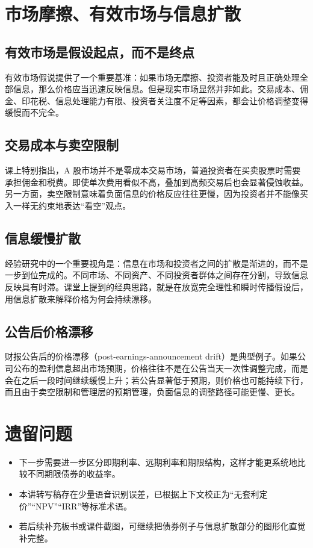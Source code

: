 \documentclass[UTF8,11pt,a4paper]{ctexart}
\begin{document}
\section{市场摩擦、有效市场与信息扩散}

\subsection{有效市场是假设起点，而不是终点}

有效市场假说提供了一个重要基准：如果市场无摩擦、投资者能及时且正确处理全部信息，那么价格应当迅速反映信息。但是现实市场显然并非如此。交易成本、佣金、印花税、信息处理能力有限、投资者关注度不足等因素，都会让价格调整变得缓慢而不完全。

\subsection{交易成本与卖空限制}

课上特别指出，A 股市场并不是零成本交易市场，普通投资者在买卖股票时需要承担佣金和税费。即使单次费用看似不高，叠加到高频交易后也会显著侵蚀收益。另一方面，卖空限制意味着负面信息的价格反应往往更慢，因为投资者并不能像买入一样无约束地表达“看空”观点。

\subsection{信息缓慢扩散}

经验研究中的一个重要视角是：信息在市场和投资者之间的扩散是渐进的，而不是一步到位完成的。不同市场、不同资产、不同投资者群体之间存在分割，导致信息反映具有时滞。课堂上提到的经典思路，就是在放宽完全理性和瞬时传播假设后，用信息扩散来解释价格为何会持续漂移。

\subsection{公告后价格漂移}

财报公告后的价格漂移（post-earnings-announcement drift）是典型例子。如果公司公布的盈利信息超出市场预期，价格往往不是在公告当天一次性调整完成，而是会在之后一段时间继续缓慢上升；若公告显著低于预期，则价格也可能持续下行，而且由于卖空限制和管理层的预期管理，负面信息的调整路径可能更慢、更长。

\section{遗留问题}

\begin{itemize}
  \item 下一步需要进一步区分即期利率、远期利率和期限结构，这样才能更系统地比较不同期限债券的收益率。
  \item 本讲转写稿存在少量语音识别误差，已根据上下文校正为“无套利定价”“NPV”“IRR”等标准术语。
  \item 若后续补充板书或课件截图，可继续把债券例子与信息扩散部分的图形化直觉补完整。
\end{itemize}
\end{document}
